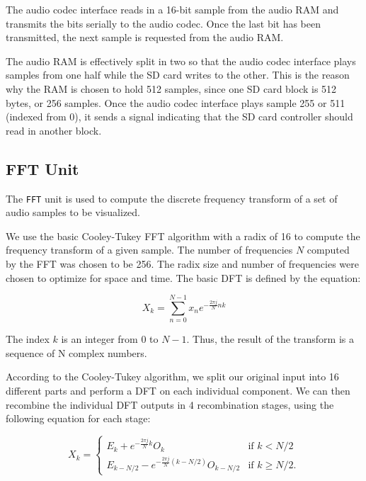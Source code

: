 \documentclass{article}
\begin{document}
The audio codec interface reads in a 16-bit sample from the audio RAM and
transmits the bits serially to the audio codec. Once the last bit has been
transmitted, the next sample is requested from the audio RAM.

The audio RAM is effectively split in two so that the audio codec interface
plays samples from one half while the SD card writes to the other. This is
the reason why the RAM is chosen to hold 512 samples, since one SD card
block is 512 bytes, or 256 samples. Once the audio codec interface plays 
sample 255 or 511 (indexed from 0), it sends a signal indicating that the 
SD card controller should read in another block.

\subsection{FFT Unit}

The \texttt{FFT} unit is used to compute the discrete frequency transform of a set of 
audio samples to be visualized. 

We use the basic Cooley-Tukey FFT algorithm with a radix of 16 to compute the
frequency transform of a given sample. The number of frequencies \(N\) computed by 
the FFT was chosen to be 256. The radix size and number of frequencies were chosen 
to optimize for space and time. The basic DFT is defined by the equation:

\begin{equation}
	X_k = \sum_{n=0}^{N-1} x_n e^{-\frac{2\pi j}{N} nk}
\end{equation}

The index \(k\) is an integer from 0 to \(N - 1\). Thus, the result of the
transform is a sequence of N complex numbers.

According to the Cooley-Tukey algorithm, we split our original input into 
16 different parts and perform a DFT on each individual component. We can then 
recombine the individual DFT outputs in 4 recombination stages, using the 
following equation for each stage: 

\begin{equation}
	X_k = \left\{
	\begin{matrix}
		E_k + e^{-\frac{2\pi j}{N}k} O_k		& 	\mbox{if } k < N/2 \\ 
		E_{k-N/2} - e^{-\frac{2\pi j}{N} (k-N/2)} O_{k-N/2} & 	\mbox{if }
		k \geq N/2. 
	\end{matrix} 
	\right.
\end{equation}
\end{document}
